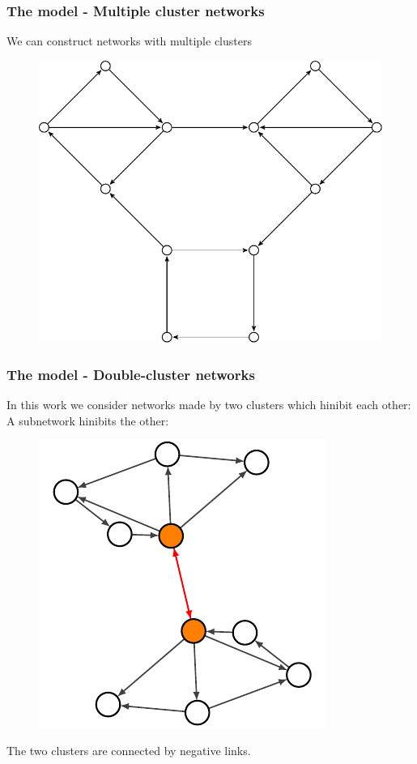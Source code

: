 \documentclass{beamer}
\begin{document}
\begin{frame}
\frametitle{The model - Multiple cluster networks}
We can construct networks with multiple clusters 
\begin{figure}
\includegraphics[scale=0.7]{grn1.pdf}
\end{figure}
\end{frame}




\begin{frame}
\frametitle{The model - Double-cluster networks}
In this work we consider networks made by two clusters which hinibit each other:
A subnetwork hinibits the other: 
\begin{figure}
\includegraphics[scale=0.8]{prova.pdf}
\end{figure}
The two clusters are connected by negative links.
\end{frame}
\end{document}
